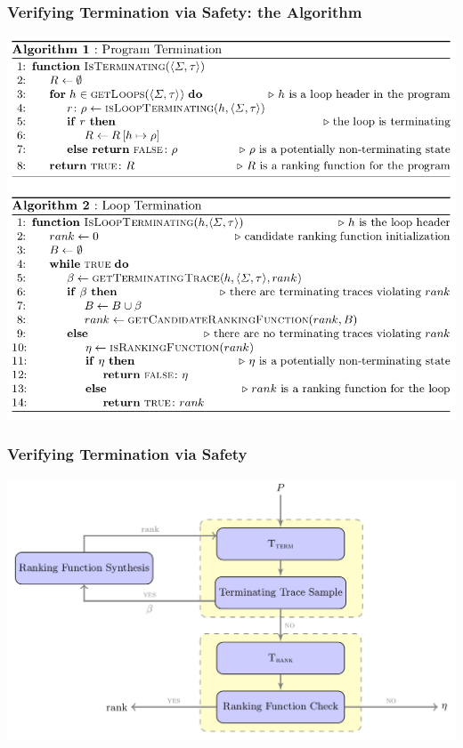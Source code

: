\documentclass[11pt]{beamer}
\begin{document}
\begin{frame}\frametitle{Verifying Termination via Safety: the Algorithm}

\begin{center}
\includegraphics[scale=0.33]{algo.png}
\end{center}

\end{frame}

\begin{frame}
\frametitle{Verifying Termination via Safety}
\begin{center}
\includegraphics[scale=0.26]{Overview.png}
\end{center}
\end{frame}
\end{document}
